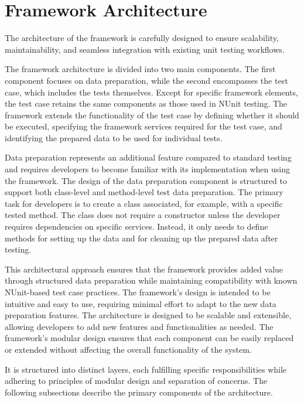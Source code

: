 
\section{Framework Architecture}

The architecture of the framework is carefully designed to ensure scalability,
maintainability, and seamless integration with existing unit testing workflows.

The framework architecture is divided into two main components. The first component focuses on data preparation, while the second encompasses the test case, which includes the tests themselves. Except for specific framework elements, the test case retains the same components as those used in NUnit testing. The framework extends the functionality of the test case by defining whether it should be executed, specifying the framework services required for the test case, and identifying the prepared data to be used for individual tests.

Data preparation represents an additional feature compared to standard testing and requires developers to become familiar with its implementation when using the framework. The design of the data preparation component is structured to support both class-level and method-level test data preparation. The primary task for developers is to create a class associated, for example, with a specific tested method. The class does not require a constructor unless the developer requires dependencies on specific services. Instead, it only needs to define methods for setting up the data and for cleaning up the prepared data after testing.

This architectural approach ensures that the framework provides added value through structured data preparation while maintaining compatibility with known NUnit-based test case practices. The framework's design is intended to be intuitive and easy to use, requiring minimal effort to adapt to the new data preparation features. The architecture is designed to be scalable and extensible, allowing developers to add new features and functionalities as needed. The framework's modular design ensures that each component can be easily replaced or extended without affecting the overall functionality of the system.

It is structured into distinct layers,
each fulfilling specific responsibilities while adhering to principles of modular design and separation of concerns. The following subsections describe the primary components of the architecture.

